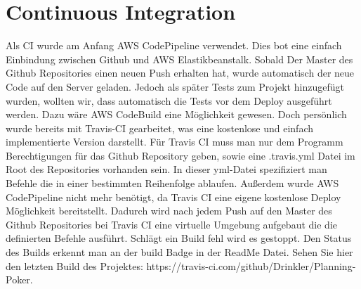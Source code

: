 \chapter{Continuous Integration}
Als CI wurde am Anfang AWS CodePipeline verwendet. Dies bot eine einfach Einbindung zwischen Github und AWS Elastikbeanstalk. Sobald Der Master des Github Repositories einen neuen Push erhalten hat, wurde automatisch der neue Code auf den Server geladen. Jedoch als später Tests zum Projekt hinzugefügt wurden, wollten wir, dass automatisch die Tests vor dem Deploy ausgeführt werden. Dazu wäre AWS CodeBuild eine Möglichkeit gewesen. Doch persönlich wurde bereits mit Travis-CI gearbeitet, was eine kostenlose und einfach implementierte Version darstellt. Für Travis CI muss man nur dem Programm Berechtigungen für das Github Repository geben, sowie eine .travis.yml Datei im Root des Repositories vorhanden sein. In dieser yml-Datei spezifiziert man Befehle die in einer bestimmten Reihenfolge ablaufen. Außerdem wurde AWS CodePipeline nicht mehr benötigt, da Travis CI eine eigene kostenlose Deploy Möglichkeit bereitstellt.
Dadurch wird nach jedem Push auf den Master des Github Repositories bei Travis CI eine virtuelle Umgebung aufgebaut die die definierten Befehle ausführt. Schlägt ein Build fehl wird es gestoppt. Den Status des Builds erkennt man an der build Badge in der ReadMe Datei. Sehen Sie hier den letzten Build des Projektes: https://travis-ci.com/github/Drinkler/Planning-Poker.